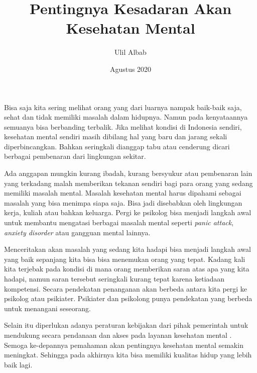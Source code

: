 \documentclass{article}
\title{Pentingnya Kesadaran Akan Kesehatan Mental}
\author{Ulil Albab }
\date{Agustus 2020}
\begin{document}
\maketitle

Bisa saja kita sering melihat orang yang dari luarnya nampak baik-baik saja, sehat dan tidak memiliki masalah dalam hidupnya. Namun pada kenyataannya semuanya bisa berbanding terbalik. Jika melihat kondisi di Indonesia sendiri, kesehatan mental sendiri masih dibilang hal yang baru dan jarang sekali diperbincangkan. Bahkan seringkali dianggap tabu atau cenderung dicari berbagai pembenaran dari lingkungan sekitar.  \par
Ada anggapan mungkin kurang ibadah, kurang bersyukur atau pembenaran lain yang terkadang malah memberikan tekanan sendiri bagi para orang yang sedang memiliki masalah mental. Masalah kesehatan mental harus dipahami sebagai masalah yang bisa menimpa siapa saja. Bisa jadi disebabkan oleh lingkungan kerja, kuliah atau bahkan keluarga. Pergi ke psikolog bisa menjadi langkah awal untuk membantu mengatasi berbagai masalah mental seperti \textit{panic attack}, \textit{anxiety disorder} atau gangguan mental lainnya. \par


Menceritakan akan masalah yang sedang kita hadapi bisa menjadi langkah awal yang baik sepanjang kita bisa bisa menemukan orang yang tepat. Kadang kali kita terjebak pada kondisi di mana orang memberikan saran atas apa yang kita hadapi, namun saran tersebut seringkali kurang tepat karena ketiadaan kompetensi. Secara pendekatan penanganan akan berbeda antara kita pergi ke psikolog atau psikiater. Psikiater dan psikolong punya pendekatan yang berbeda untuk menangani seseorang. \par
Selain itu diperlukan adanya peraturan kebijakan dari pihak pemerintah untuk mendukung secara pendanaan dan akses pada layanan kesehatan
mental \cite{ayuningtyas2018analisis}. Semoga ke-depannya pemahaman akan pentingnya kesehatan mental semakin meningkat. Sehingga pada akhirnya kita bisa memiliki kualitas hidup yang lebih baik lagi. 



\printbibliography
\end{document}
